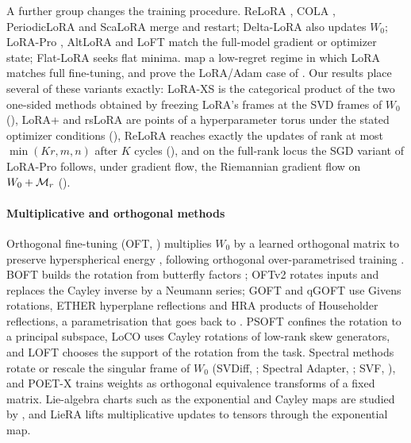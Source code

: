 A further group changes the training procedure. ReLoRA \citep{lialin2023relora}, COLA \citep{xia2024chain}, PeriodicLoRA \citep{meng2024periodiclora} and ScaLoRA \citep{zhang2025scalora} merge and restart; Delta-LoRA \citep{zi2023delta} also updates $W_0$; LoRA-Pro \citep{wang2024lorac}, AltLoRA \citep{yu2025altlora} and LoFT \citep{tastan2025loft} match the full-model gradient or optimizer state; Flat-LoRA \citep{li2024flat} seeks flat minima. \citet{schulman2025lora} map a low-regret regime in which LoRA matches full fine-tuning, and prove the LoRA/Adam case of . Our results place several of these variants exactly: LoRA-XS is the categorical product of the two one-sided methods obtained by freezing LoRA's frames at the SVD frames of $W_0$ (), LoRA+ and rsLoRA are points of a hyperparameter torus under the stated optimizer conditions (), ReLoRA reaches exactly the updates of rank at most $\min(Kr,m,n)$ after $K$ cycles (), and on the full-rank locus the SGD variant of LoRA-Pro follows, under gradient flow, the Riemannian gradient flow on $W_0+\mathcal{M}_r$ ().

\paragraph{Multiplicative and orthogonal methods}
Orthogonal fine-tuning (OFT, \citealp{qiu2023controlling}) multiplies $W_0$ by a learned orthogonal matrix to preserve hyperspherical energy \citep{liu2018learning}, following orthogonal over-parametrised training \citep{liu2020orthogonal}. BOFT \citep{liu2023parameter} builds the rotation from butterfly factors \citep{dao2019learning}; OFTv2 \citep{qiu2025orthogonal} rotates inputs and replaces the Cayley inverse by a Neumann series; GOFT and qGOFT \citep{ma2024parameter} use Givens rotations, ETHER \citep{bini2024ether} hyperplane reflections and HRA \citep{yuan2024bridging} products of Householder reflections, a parametrisation that goes back to \citet{mhammedi2016efficient}. PSOFT \citep{wu2025efficient} confines the rotation to a principal subspace, LoCO \citep{nguyen2026loco} uses Cayley rotations of low-rank skew generators, and LOFT \citep{zhao2026loft} chooses the support of the rotation from the task. Spectral methods rotate or rescale the singular frame of $W_0$ (SVDiff, \citealp{han2023svdiff}; Spectral Adapter, \citealp{zhang2024spectral}; SVF, \citealp{sun2025transformer}), and POET-X \citep{qiu2026poet} trains weights as orthogonal equivalence transforms of a fixed matrix. Lie-algebra charts such as the exponential and Cayley maps are studied by \citet{lezcanocasado2019cheap}, and LieRA \citep{si2025generalized} lifts multiplicative updates to tensors through the exponential map.

